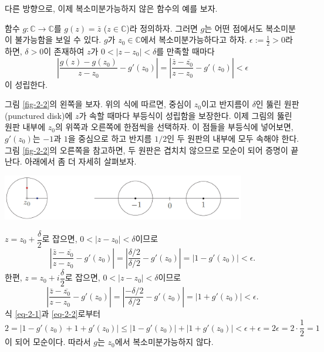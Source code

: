다른 방향으로, 이제 복소미분가능하지 않은 함수의 예를 보자.

\begin{saltexample}[label=example-2-2]{}{}
함수 $g:\mathbb C \to \mathbb C$를 $g(z) = \bar z$ ($z\in\mathbb C$)라 정의하자.
그러면 $g$는 어떤 점에서도 복소미분이 불가능함을 보일 수 있다.
$g$가 $z_0\in\mathbb C$에서 복소미분가능하다고 하자.
$\epsilon:=\frac12 >0$라 하면, $\delta>0$이 존재하여
$z$가 $0<|z-z_0|<\delta$를 만족할 때마다 
\[
\left| \dfrac{g(z)-g(z_0)}{z-z_0} - g'(z_0) \right| 
= \left| \dfrac{\bar z - \overline{z_0}}{z-z_0} - g'(z_0) \right| 
<\epsilon
\]
이 성립한다.

그림 \ref{fig-2-2}의 왼쪽을 보자.
위의 식에 따르면,
중심이 $z_0$이고 반지름이 $\delta$인 뚫린 원판(punctured disk)에 $z$가 속할 때마다
부등식이 성립함을 보장한다.
이제 그림의 뚫린 원판 내부에 $z_0$의 위쪽과 오른쪽에 한점씩을 선택하자.
이 점들을 부등식에 넣어보면, $g'(z_0)$는 $-1$과 $1$을 중심으로 하고 반지름 $1/2$인 두
원판의 내부에 모두 속해야 한다.
그림 \ref{fig-2-2}의 오른쪽을 참고하면, 두 원판은 겹치치 않으므로 모순이 되어 증명이 끝난다.
아래에서 좀 더 자세히 살펴보자.

\begin{center}
\includegraphics[width=0.8\textwidth]{./SaltChapter/figs/fig-2-2}
\end{center}
\label{fig-2-2}
\saltvskipex

$z=z_0+ \dfrac\delta2$로 잡으면, $0<|z-z_0|<\delta$이므로
\begin{equation} \label{eq-2-1}
\left| \dfrac{\bar z - \overline{z_0}}{z-z_0} - g'(z_0) \right| 
= \left| \dfrac{\delta/2}{\delta/2} - g'(z_0) \right| 
= | 1 - g'(z_0)| < \epsilon.
\end{equation}
한편, $z=z_0+ i\dfrac\delta2$로 잡으면, $0<|z-z_0|<\delta$이므로
\begin{equation} \label{eq-2-2}
\left| \dfrac{\bar z - \overline{z_0}}{z-z_0} - g'(z_0) \right| 
= \left| \dfrac{-\delta/2}{\delta/2} - g'(z_0) \right| 
= | 1 + g'(z_0)| < \epsilon.
\end{equation}
식 \eqref{eq-2-1}과 \eqref{eq-2-2}로부터
\[
2 = | 1- g'(z_0) + 1+ g'(z_0)|
\le |1-g'(z_0)| + |1+g'(z_0)| < \epsilon + \epsilon 
= 2\epsilon = 2\cdot\dfrac12 = 1
\]
이 되어 모순이다.
따라서 $g$는 $z_0$에서 복소미분가능하지 않다.
\end{saltexample}

